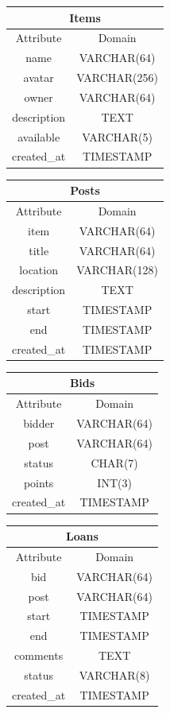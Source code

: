 \begin{center}
\begin{tabular}{|c|c|}
\multicolumn{2}{c}{Items}\\[2mm]
\hline
Attribute & Domain\\
\hline
name & VARCHAR(64)\\
avatar & VARCHAR(256) \\
owner & VARCHAR(64) \\
description & TEXT \\
available & VARCHAR(5)\\
created\_at & TIMESTAMP \\
\hline
\end{tabular}
\end{center}

\begin{center}
\begin{tabular}{|c|c|}
\multicolumn{2}{c}{Posts}\\[2mm]
\hline
Attribute & Domain\\
\hline
item & VARCHAR(64)\\
title & VARCHAR(64) \\
location & VARCHAR(128) \\
description & TEXT \\
start & TIMESTAMP \\
end & TIMESTAMP \\
created\_at & TIMESTAMP \\
\hline
\end{tabular}
\end{center}

\begin{center}
\begin{tabular}{|c|c|}
\multicolumn{2}{c}{Bids}\\[2mm]
\hline
Attribute & Domain\\
\hline
bidder & VARCHAR(64)\\
post & VARCHAR(64) \\
status & CHAR(7) \\
points & INT(3) \\
created\_at & TIMESTAMP \\
\hline
\end{tabular}
\end{center}

\begin{center}
\begin{tabular}{|c|c|}
\multicolumn{2}{c}{Loans}\\[2mm]
\hline
Attribute & Domain\\
\hline
bid & VARCHAR(64)\\
post & VARCHAR(64) \\
start & TIMESTAMP \\
end & TIMESTAMP \\
comments & TEXT \\
status & VARCHAR(8) \\
created\_at & TIMESTAMP \\
\hline
\end{tabular}
\end{center}


